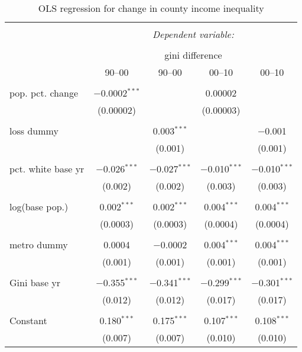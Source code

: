 
\begin{table}[p] \centering 
  \caption{OLS regression for change in county income inequality} 
  \label{} 
\begin{tabular}{@{\extracolsep{5pt}}lcccc} 
\\[-1.8ex]\hline 
\hline \\[-1.8ex] 
 & \multicolumn{4}{c}{\textit{Dependent variable:}} \\ 
\cline{2-5} 
\\[-1.8ex] & \multicolumn{4}{c}{gini difference} \\ 
 & 90--00 & 90--00 & 00--10 & 00--10 \\ 
\hline \\[-1.8ex] 
 pop. pct. change & $-$0.0002$^{***}$ &  & 0.00002 &  \\ 
  & (0.00002) &  & (0.00003) &  \\ 
  & & & & \\ 
 loss dummy &  & 0.003$^{***}$ &  & $-$0.001 \\ 
  &  & (0.001) &  & (0.001) \\ 
  & & & & \\ 
 pct. white base yr & $-$0.026$^{***}$ & $-$0.027$^{***}$ & $-$0.010$^{***}$ & $-$0.010$^{***}$ \\ 
  & (0.002) & (0.002) & (0.003) & (0.003) \\ 
  & & & & \\ 
 log(base pop.) & 0.002$^{***}$ & 0.002$^{***}$ & 0.004$^{***}$ & 0.004$^{***}$ \\ 
  & (0.0003) & (0.0003) & (0.0004) & (0.0004) \\ 
  & & & & \\ 
 metro dummy & 0.0004 & $-$0.0002 & 0.004$^{***}$ & 0.004$^{***}$ \\ 
  & (0.001) & (0.001) & (0.001) & (0.001) \\ 
  & & & & \\ 
 Gini base yr & $-$0.355$^{***}$ & $-$0.341$^{***}$ & $-$0.299$^{***}$ & $-$0.301$^{***}$ \\ 
  & (0.012) & (0.012) & (0.017) & (0.017) \\ 
  & & & & \\ 
 Constant & 0.180$^{***}$ & 0.175$^{***}$ & 0.107$^{***}$ & 0.108$^{***}$ \\ 
  & (0.007) & (0.007) & (0.010) & (0.010) \\ 

\end{tabular}
\end{table}
